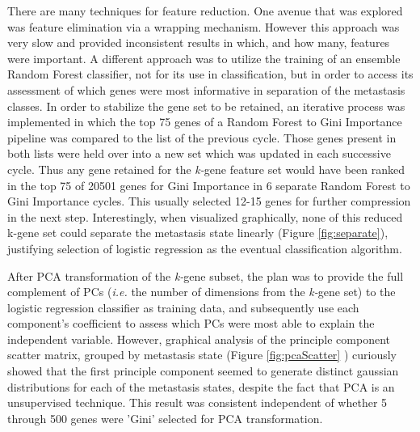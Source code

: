 \documentclass[final]{article}
\begin{document}
There are many techniques for feature reduction.  One avenue that was explored
was feature elimination via a wrapping mechanism.  However this approach was
very slow and provided inconsistent results in which, and how many, features
were important. A different approach was to utilize the training of an ensemble
Random Forest classifier, not for its use in classification, but in order to
access its assessment of which genes were most informative in separation of the
metastasis classes.  In order to stabilize the gene set to be retained, an
iterative process was implemented in which the top 75 genes of a Random Forest
to Gini Importance pipeline was compared to the list of the previous cycle.
Those genes present in both lists were held over into a new set which was
updated in each successive cycle.  Thus any gene retained for the
\textit{k-}gene feature set would have been ranked in the top 75 of 20501 genes
for Gini Importance in 6 separate Random Forest to Gini Importance cycles.  This
usually selected 12-15 genes for further compression in the next step.
Interestingly, when visualized graphically, none of this reduced k-gene set
could separate the metastasis state linearly (Figure \ref{fig:separate}),
justifying selection of logistic regression as the eventual classification
algorithm.

After PCA transformation of the \textit{k-}gene subset, the plan was to provide
the full complement of PCs (\textit{i.e.} the number of dimensions from the
\textit{k-}gene set) to the logistic regression classifier as training data, and
subsequently use each component's coefficient to  assess which PCs were most able to
explain the independent variable.  However, graphical analysis of the
principle component scatter matrix, grouped by metastasis state (Figure
\ref{fig:pcaScatter} ) curiously showed that the first principle component
seemed to generate distinct gaussian distributions for each of the metastasis
states, despite the fact that PCA is an unsupervised technique.  This result was
consistent independent of whether 5 through 500 genes were 'Gini' selected for
PCA transformation.
\end{document}
